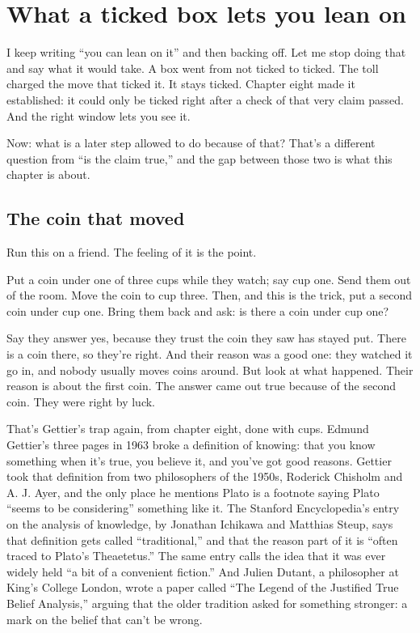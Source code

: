 \documentclass[11pt,twoside]{article}
\theoremstyle{thielethm}
\theoremstyle{thieledef}
\theoremstyle{thieledef}
\theoremstyle{thieledef}
\theoremstyle{thielethm}
\theoremstyle{thieleobs}
\theoremstyle{thielethm}
\begin{document}
\section{What a ticked box lets you lean on}
\label{sec:lean-on}

I keep writing ``you can lean on it'' and then backing off. Let me stop doing that and say what it would take. A box went from not ticked to ticked. The toll charged the move that ticked it. It stays ticked. Chapter eight made it established: it could only be ticked right after a check of that very claim passed. And the right window lets you see it.

Now: what is a later step allowed to do because of that? That's a different question from ``is the claim true,'' and the gap between those two is what this chapter is about.

\subsection{The coin that moved}

Run this on a friend. The feeling of it is the point.

Put a coin under one of three cups while they watch; say cup one. Send them out of the room. Move the coin to cup three. Then, and this is the trick, put a second coin under cup one. Bring them back and ask: is there a coin under cup one?

Say they answer yes, because they trust the coin they saw has stayed put. There is a coin there, so they're right. And their reason was a good one: they watched it go in, and nobody usually moves coins around. But look at what happened. Their reason is about the first coin. The answer came out true because of the second coin. They were right by luck.

That's Gettier's trap again, from chapter eight, done with cups. Edmund Gettier's three pages in 1963 broke a definition of knowing: that you know something when it's true, you believe it, and you've got good reasons. Gettier took that definition from two philosophers of the 1950s, Roderick Chisholm and A. J. Ayer, and the only place he mentions Plato is a footnote saying Plato ``seems to be considering'' something like it. The Stanford Encyclopedia's entry on the analysis of knowledge, by Jonathan Ichikawa and Matthias Steup, says that definition gets called ``traditional,'' and that the reason part of it is ``often traced to Plato's Theaetetus.'' The same entry calls the idea that it was ever widely held ``a bit of a convenient fiction.'' And Julien Dutant, a philosopher at King's College London, wrote a paper called ``The Legend of the Justified True Belief Analysis,'' arguing that the older tradition asked for something stronger: a mark on the belief that can't be wrong.
\end{document}
